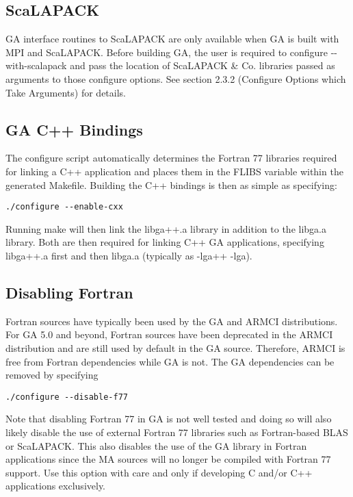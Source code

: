 \subsection{ScaLAPACK}

GA interface routines to ScaLAPACK are only available when GA is built with MPI
and ScaLAPACK. Before building GA, the user is required to configure
-{}-with-scalapack and pass the location of ScaLAPACK \& Co. libraries passed
as arguments to those configure options. See section 2.3.2 (Configure Options
which Take Arguments) for details. 

\subsection{GA C++ Bindings}

The configure script automatically determines the Fortran 77 libraries required
for linking a C++ application and places them in the FLIBS variable within the
generated Makefile. Building the C++ bindings is then as simple as specifying: 
\begin{verbatim}
./configure --enable-cxx
\end{verbatim}
Running make will then link the libga++.a library in addition to the libga.a
library. Both are then required for linking C++ GA applications, specifying
libga++.a first and then libga.a (typically as -lga++ -lga). 

\subsection{Disabling Fortran}

Fortran sources have typically been used by the GA and ARMCI distributions.
For GA 5.0 and beyond, Fortran sources have been deprecated in the ARMCI
distribution and are still used by default in the GA source.  Therefore, ARMCI
is free from Fortran dependencies while GA is not.  The GA dependencies can be
removed by specifying 
\begin{verbatim}
./configure --disable-f77
\end{verbatim}
Note that disabling Fortran 77 in GA is not well tested and doing so will also
likely disable the use of external Fortran 77 libraries such as Fortran-based
BLAS or ScaLAPACK. This also disables the use of the GA library in Fortran
applications since the MA sources will no longer be compiled with Fortran 77
support. Use this option with care and only if developing C and/or C++
applications exclusively. 

